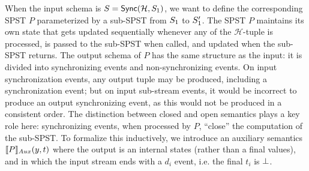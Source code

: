 When the input schema is $\ss=\hier{\mathcal{H}}{\ss_1}$, we want to
define the corresponding SPST $P$ parameterized by a sub-SPST from
$\ss_1$ to $\ss'_1$.
The SPST $P$ maintains its own state that gets updated sequentially
whenever any of the $\mathcal{H}$-tuple is processed,
is passed to the sub-SPST when called, and updated when the sub-SPST returns.
The output schema of $P$ has the same structure as the input:
it is divided into synchronizing events and non-synchronizing events.
On input synchronization events, any output tuple may be produced,
including a synchronization event; but on input sub-stream events, it would be incorrect
to produce an output synchronizing event, as this would not be produced in a consistent order.
The distinction between closed and open
semantics plays a key role here:
synchronizing events, when processed by $P$, ``close'' the computation of the sub-SPST.
To formalize this inductively,
we introduce an auxiliary semantics $\spstsemI{y}{t}{P}$
where the output is an internal states (rather than a final values),
and in which the input stream ends with a $d_i$ event,
i.e. the final $t_i$ is $\spsemp{}$.

